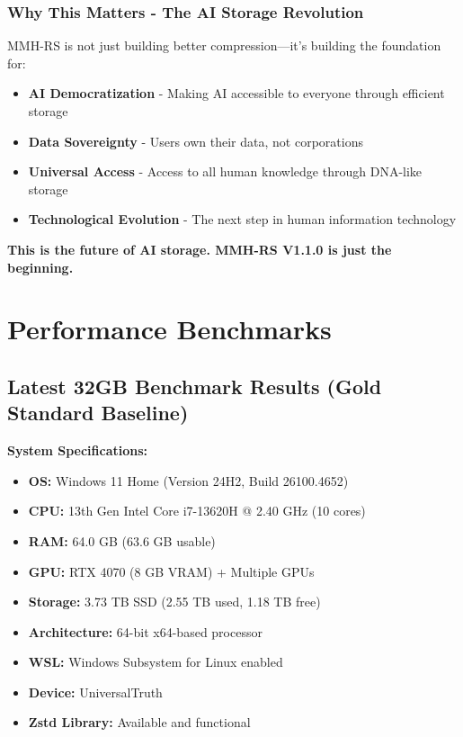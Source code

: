 \documentclass[11pt,a4paper]{article}
\begin{document}
	\subsubsection{Why This Matters - The AI Storage Revolution}

	MMH-RS is not just building better compression—it's building the foundation for:
	\begin{itemize}
		\item \textbf{AI Democratization} - Making AI accessible to everyone through efficient storage
		\item \textbf{Data Sovereignty} - Users own their data, not corporations
		\item \textbf{Universal Access} - Access to all human knowledge through DNA-like storage
		\item \textbf{Technological Evolution} - The next step in human information technology
	\end{itemize}

	\textbf{This is the future of AI storage. MMH-RS V1.1.0 is just the beginning.}

	\section{Performance Benchmarks}
	\label{sec:benchmarks}

	\subsection{Latest 32GB Benchmark Results (Gold Standard Baseline)}

	\textbf{System Specifications:}
	\begin{itemize}
		\item \textbf{OS:} Windows 11 Home (Version 24H2, Build 26100.4652)
		\item \textbf{CPU:} 13th Gen Intel Core i7-13620H @ 2.40 GHz (10 cores)
		\item \textbf{RAM:} 64.0 GB (63.6 GB usable)
		\item \textbf{GPU:} RTX 4070 (8 GB VRAM) + Multiple GPUs
		\item \textbf{Storage:} 3.73 TB SSD (2.55 TB used, 1.18 TB free)
		\item \textbf{Architecture:} 64-bit x64-based processor
		\item \textbf{WSL:} Windows Subsystem for Linux enabled
		\item \textbf{Device:} UniversalTruth
		\item \textbf{Zstd Library:} Available and functional
	\end{itemize}
\end{document}
